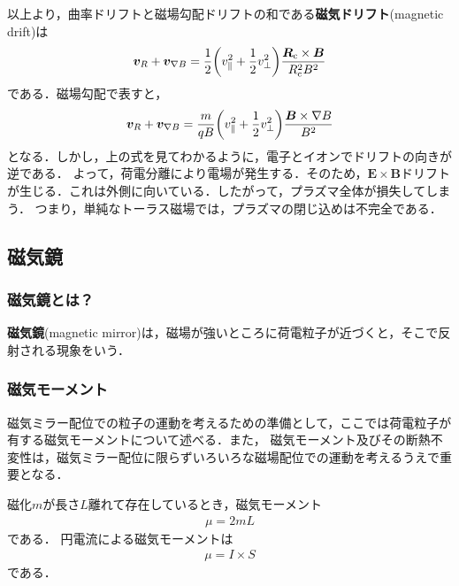 \documentclass{report}
\begin{document}
          以上より，曲率ドリフトと磁場勾配ドリフトの和である\textbf{磁気ドリフト}(magnetic drift)は
          \begin{align}
            \bm{v}_{R} + \bm{v}_{\nabla B} = \frac{1}{2}\qty(v_{\parallel}^2 + \frac{1}{2}v_{\perp}^2)\frac{\bm{R}_{\mathrm{c}} \times \bm{B}}{R_{\mathrm{c}}^2 B^2}
          \end{align}
          である．磁場勾配で表すと，
          \begin{align}
            \bm{v}_{R} + \bm{v}_{\nabla B} =\frac{m}{qB}\qty(v_{\parallel}^2 + \frac{1}{2}v_{\perp}^2) \frac{\bm{B} \times \nabla B}{B^2}
          \end{align}
          となる．しかし，上の式を見てわかるように，電子とイオンでドリフトの向きが逆である．
          よって，荷電分離により電場が発生する．そのため，$\bm{E}\times\bm{B}$ドリフトが生じる．これは外側に向いている．したがって，プラズマ全体が損失してしまう．
          つまり，単純なトーラス磁場では，プラズマの閉じ込めは不完全である．

    \subsection{磁気鏡}
      \subsubsection{磁気鏡とは？}
        \textbf{磁気鏡}(magnetic mirror)は，磁場が強いところに荷電粒子が近づくと，そこで反射される現象をいう．

      \subsubsection{磁気モーメント}
        磁気ミラー配位での粒子の運動を考えるための準備として，ここでは荷電粒子が有する磁気モーメントについて述べる．また，
        磁気モーメント及びその断熱不変性は，磁気ミラー配位に限らずいろいろな磁場配位での運動を考えるうえで重要となる．

        磁化$m$が長さ$L$離れて存在しているとき，磁気モーメント
        \begin{align}
          \mu = 2mL
        \end{align}
        である．
        円電流による磁気モーメントは
        \begin{align}
          \mu = I \times S
        \end{align}
        である．
\end{document}
